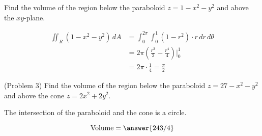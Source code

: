 \documentclass[handout]{ximera}
\begin{document}
\begin{example}[Example 3]
Find the volume of the region below the paraboloid $z = 1 - x^2 - y^2$ and above the $xy$-plane.\\

\begin{image}
\end{image}

\begin{align*}
\iint_R (1-x^2 - y^2) \, dA &= \int_0^{2\pi} \int_0^1 (1-r^2) \cdot r \, dr \, d\theta\\
                            &= 2\pi \left(\frac{r^2}{2} - \frac{r^4}{4}\right) \bigg|_0^1\\
                            &= 2\pi \cdot \frac14 = \frac{\pi}{2}
\end{align*}
\end{example}

\begin{problem}(Problem 3)
Find the volume of the region below the paraboloid $z = 27 - x^2 - y^2$ and above the cone $z = 2x^2 + 2y^2$.\\
\begin{hint}
The intersection of the paraboloid and the cone is a circle.
\end{hint}
\[
\text{Volume} = \answer{243/4}
\]
\end{problem}
\end{document}
